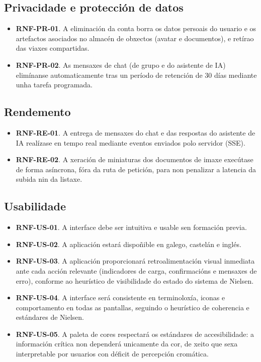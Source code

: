 \subsection{Privacidade e protección de datos}

\begin{itemize}
  \item \textbf{RNF-PR-01}. A eliminación da conta borra os datos persoais do usuario e os artefactos asociados no almacén de obxectos (avatar e documentos), e retírao das viaxes compartidas.
  \item \textbf{RNF-PR-02}. As mensaxes de chat (de grupo e do asistente de IA) elimínanse automaticamente tras un período de retención de 30 días mediante unha tarefa programada.
\end{itemize}

\subsection{Rendemento}

\begin{itemize}
  \item \textbf{RNF-RE-01}. A entrega de mensaxes do chat e das respostas do asistente de IA realízase en tempo real mediante eventos enviados polo servidor (SSE).
  \item \textbf{RNF-RE-02}. A xeración de miniaturas dos documentos de imaxe execútase de forma asíncrona, fóra da ruta de petición, para non penalizar a latencia da subida nin da listaxe.
\end{itemize}

\subsection{Usabilidade}

\begin{itemize}
  \item \textbf{RNF-US-01}. A interface debe ser intuitiva e usable sen formación previa.
  \item \textbf{RNF-US-02}. A aplicación estará dispoñible en galego, castelán e inglés.
  \item \textbf{RNF-US-03}. A aplicación proporcionará retroalimentación visual inmediata
        ante cada acción relevante (indicadores de carga, confirmacións e mensaxes de erro),
        conforme ao heurístico de visibilidade do estado do sistema de Nielsen.
  \item \textbf{RNF-US-04}. A interface será consistente en terminoloxía, iconas e
        comportamento en todas as pantallas, seguindo o heurístico de coherencia e estándares
        de Nielsen.
  \item \textbf{RNF-US-05}. A paleta de cores respectará os estándares de accesibilidade:
        a información crítica non dependerá unicamente da cor, de xeito que sexa interpretable
        por usuarios con déficit de percepción cromática.
\end{itemize}

